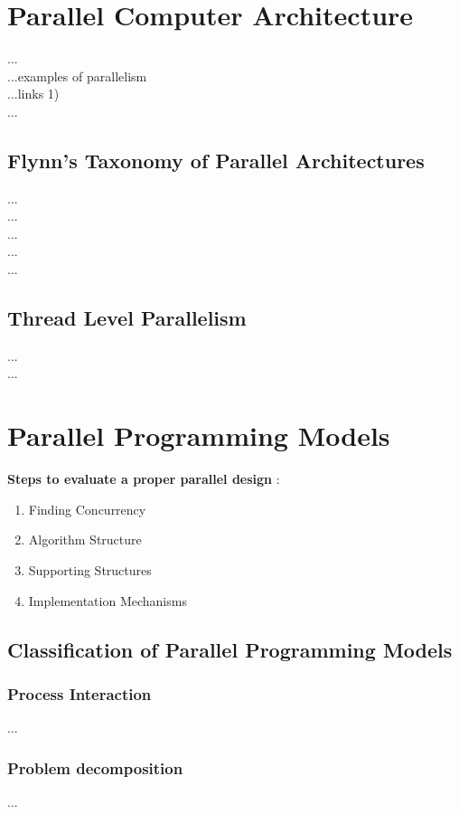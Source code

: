 \newpage

\section{Parallel Computer Architecture}

...\parencite[see][p9]{book1} \\
...examples of parallelism \parencite[see][p11]{book1} \\
...links 1) \\
...\parencite[see][p9 ff.]{book5}


\subsection{Flynn's Taxonomy of Parallel Architectures}

...\parencite[see][p5]{internet1}\\
...\parencite[see][p13]{book1}\\
...\parencite[see][p4]{book5}\\
...\parencite[see][p2]{book6}\\
...\parencite[see][p15-p26]{internet2}

\subsection{Thread Level Parallelism}\label{subchap:threadLevelParallelism}

...\parencite[see][p24]{book1}\\
...\parencite[see][p14]{article6}

\section{Parallel Programming Models}

\textbf{Steps to evaluate a proper parallel design} \parencite[see][p6]{article6}:
\begin{enumerate}
	\item Finding Concurrency
	\item Algorithm Structure
	\item Supporting Structures
	\item Implementation Mechanisms
\end{enumerate}

\newpage

\subsection{Classification of Parallel Programming Models}

\subsubsection{Process Interaction}

...\parencite[see][p4]{internet1}

\subsubsection{Problem decomposition}

...\parencite[see][p105 ff.]{book1}